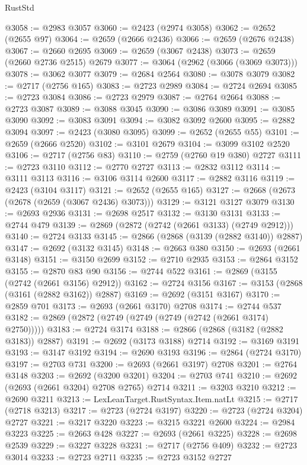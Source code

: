 \begin{lexlean}{RustStd}
\begin{coremodule}
@3058 := @2983 @3057
@3060 := @2423 (@2974 @3058)
@3062 := @2652 (@2655 @97)
@3064 := @2659 (@2666 @2436)
@3066 := @2659 (@2676 @2438)
@3067 := @2660 @2695
@3069 := @2659 (@3067 @2438)
@3073 := @2659 (@2660 @2736 @2515) @2679
@3077 := @3064 (@2962 (@3066 (@3069 @3073)))
@3078 := @3062 @3077
@3079 := @2684 @2564
@3080 := @3078 @3079
@3082 := @2717 (@2756 @165)
@3083 := @2723 @2989
@3084 := @2724 @2694
@3085 := @2723 @3084
@3086 := @2723 @2979
@3087 := @2764 @2664
@3088 := @2723 @3087
@3089 := @3088 @3045
@3090 := @3086 @3089
@3091 := @3085 @3090
@3092 := @3083 @3091
@3094 := @3082 @3092 @2600
@3095 := @2882 @3094
@3097 := @2423 (@3080 @3095)
@3099 := @2652 (@2655 @55)
@3101 := @2659 (@2666 @2520)
@3102 := @3101 @2679
@3104 := @3099 @3102 @2520
@3106 := @2717 (@2756 @83)
@3110 := @2759 (@2760 @19 @380) @2727
@3111 := @2723 @3110
@3112 := @2770 @2727
@3113 := @2832 @3112
@3114 := @3111 @3113
@3116 := @3106 @3114 @2600
@3117 := @2882 @3116
@3119 := @2423 (@3104 @3117)
@3121 := @2652 (@2655 @165)
@3127 := @2668 (@2673 (@2678 (@2659 (@3067 @2436) @3073)))
@3129 := @3121 @3127 @3079
@3130 := @2693 @2936
@3131 := @2698 @2517
@3132 := @3130 @3131
@3133 := @2744 @479
@3139 := @2869 (@2872 (@2742 (@2661 @3133) (@2749 @2912)))
@3140 := @2724 @3133
@3145 := @2866 (@2868 (@3139 (@2882 @3140)) @2887)
@3147 := @2692 (@3132 @3145)
@3148 := @2663 @380
@3150 := @2693 (@2661 @3148)
@3151 := @3150 @2699
@3152 := @2710 @2935
@3153 := @2864 @3152
@3155 := @2870 @83 @90
@3156 := @2744 @522
@3161 := @2869 (@3155 (@2742 (@2661 @3156) @2912))
@3162 := @2724 @3156
@3167 := @3153 (@2868 (@3161 (@2882 @3162)) @2887)
@3169 := @2692 (@3151 @3167)
@3170 := @2859 @701
@3173 := @2693 (@2661 @3170) @2708
@3174 := @2744 @537
@3182 := @2869 (@2872 (@2749 (@2749 (@2749 (@2742 (@2661 @3174) @2750)))))
@3183 := @2724 @3174
@3188 := @2866 (@2868 (@3182 (@2882 @3183)) @2887)
@3191 := @2692 (@3173 @3188) @2714
@3192 := @3169 @3191
@3193 := @3147 @3192
@3194 := @2690 @3193
@3196 := @2864 (@2724 @3170)
@3197 := @2703 @731
@3200 := @2693 (@2661 @3197) @2708
@3201 := @2764 @3148
@3203 := @2692 (@3200 @3201)
@3204 := @2703 @741
@3210 := @2692 (@2693 (@2661 @3204) @2708 @2765) @2714
@3211 := @3203 @3210
@3212 := @2690 @3211
@3213 := LexLeanTarget.RustSyntax.Item.natLt
@3215 := @2717 (@2718 @3213)
@3217 := @2723 (@2724 @3197)
@3220 := @2723 (@2724 @3204) @2727
@3221 := @3217 @3220
@3223 := @3215 @3221 @2600
@3224 := @2984 @3223
@3225 := @2663 @428
@3227 := @2693 (@2661 @3225)
@3228 := @2698 @2539
@3229 := @3227 @3228
@3231 := @2717 (@2756 @409)
@3232 := @2723 @3014
@3233 := @2723 @2711
@3235 := @2723 @3152 @2727

\end{coremodule}
\end{lexlean}
